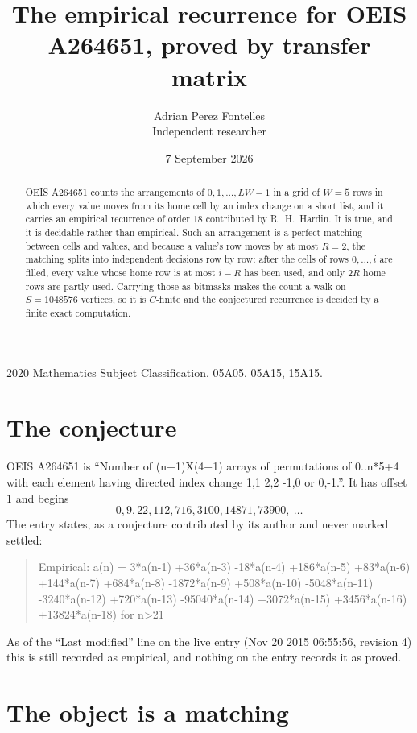 \documentclass[11pt,a4paper]{article}
\title{The empirical recurrence for OEIS A264651, proved by transfer matrix}
\author{Adrian Perez Fontelles\\ \small Independent researcher}
\date{7 September 2026}
\theoremstyle{plain}
\theoremstyle{definition}
\begin{document}
\maketitle

\begin{abstract}
OEIS A264651 counts the arrangements of $0,1,\dots,LW-1$ in a grid of $W=5$ rows in which
every value moves from its home cell by an index change on a short list, and it carries an
empirical recurrence of order $18$ contributed by R.~H.~Hardin. It is true, and it is
decidable rather than empirical. Such an arrangement is a perfect matching between cells and
values, and because a value's row moves by at most $R=2$, the matching splits into
independent decisions row by row: after the cells of rows $0,\dots,i$ are filled,
every value whose home row is at most $i-R$ has been used, and only $2R$ home rows are
partly used. Carrying those as bitmasks makes the count a walk on $S=1048576$ vertices, so it is
$C$-finite and the conjectured recurrence is decided by a finite exact computation.
\end{abstract}

\noindent\small 2020 Mathematics Subject Classification. 05A05, 05A15, 15A15.\normalsize

\section{The conjecture}

OEIS A264651 is ``Number of (n+1)X(4+1) arrays of permutations of 0..n*5+4 with each element having directed index change 1,1 2,2 -1,0 or 0,-1.''. It has offset $1$ and begins
\[
0, 9, 22, 112, 716, 3100, 14871, 73900,\ \dots
\]
The entry states, as a conjecture contributed by its author and never marked settled:
\begin{quote}
Empirical: a(n) = 3*a(n-1) +36*a(n-3) -18*a(n-4) +186*a(n-5) +83*a(n-6) +144*a(n-7) +684*a(n-8) -1872*a(n-9) +508*a(n-10) -5048*a(n-11) -3240*a(n-12) +720*a(n-13) -95040*a(n-14) +3072*a(n-15) +3456*a(n-16) +13824*a(n-18) for n>21
\end{quote}
As of the ``Last modified'' line on the live entry (Nov 20 2015 06:55:56, revision 4) this is still
recorded as empirical, and nothing on the entry records it as proved.

\section{The object is a matching}
\end{document}
